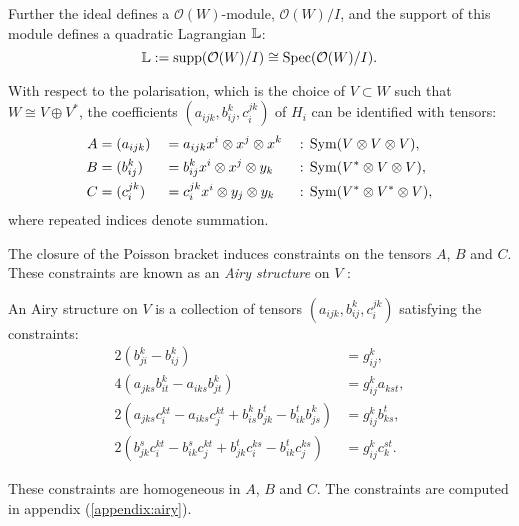     Further the ideal defines a \( \mathcal{O}(W) \)-module, \( \mathcal{O}(W)/I\), and  the support of this module defines a quadratic Lagrangian \( \mathbb{L} \): \[ \mathbb{L}  := \mathrm{supp}( \mathcal{O}(W)/I ) \cong \mathrm{Spec}( \mathcal{O}(W)/I ) .\]
    
    With respect to the polarisation, which is the choice of \(V\subset W\) such that \(W\cong V\oplus V^*\), the coefficients \((a_{ijk},b_{ij}^k,c_{i}^{jk})\) of \(H_i\)  can be identified with tensors:
    \begin{alignat*}{3}  
    \label{airytensor}
    A & =(a_{ijk}) && = a_{ijk}x^i \otimes x^j \otimes x^k && : \,  \mathrm{Sym}(V\otimes V\otimes V),\\
    B & =(b_{ij}^k) && = b_{ij}^k x^i \otimes x^j \otimes y_k &&  :\,  \mathrm{Sym}( V^*\otimes V\otimes V),\\   
    C & =(c_i^{jk}) && = c_i^{jk}x^i \otimes y_j \otimes y_k &&  :\,  \mathrm{Sym}( V^*\otimes V^*\otimes V),
    \end{alignat*}
    where repeated indices denote summation.
    
    The closure of the Poisson bracket induces constraints on the tensors \(A\), \(B\) and \(C\). These constraints are known as an \emph{Airy structure} on \(V\) \cite{ks_airy, abcd}:  

    \begin{defn}\label{defn:airystruct} An Airy structure on \(V\) is a collection of tensors \( (a_{ijk},b_{ij}^k,c_i^{jk})\) satisfying the constraints:
    \begin{align*}
       2 \left(  b_{ji}^k - b_{ij}^k \right) &= g_{ij}^k,\\
       4\left( a_{jks} b_{it}^k -  a_{iks} b_{jt}^k \right) &=  g_{ij}^k  a_{kst}, \\
       2\left(  a_{jks} c_i^{k t} -  a_{ik s} c_j^{k t} +  b_{is}^k b_{jk}^t  -  b_{ik}^t b_{js}^k \right) & =  g_{ij}^k b_{ ks}^t, \\ 
       2 \left( b_{jk}^s c_i^{kt}  - b_{ik}^s c_j^{kt}+b_{jk}^t c_i^{ks}  - b_{ik}^t c_j^{ks}\right) &= g_{ij}^k c_k^{st}.
    \end{align*}


    \end{defn}
    These constraints are homogeneous in \(A\), \(B\) and \(C\). The constraints are computed in appendix (\ref{appendix:airy}).


    

